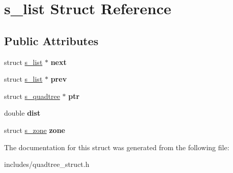 \hypertarget{structs__list}{}\section{s\+\_\+list Struct Reference}
\label{structs__list}
\subsection*{Public Attributes}
\begin{DoxyCompactItemize}
\item 
\mbox{\label{structs__list_a4586dc4198372dd0c0621981ef05d196}} 
struct \hyperlink{structs__list}{s\+\_\+list} $\ast$ {\bfseries next}
\item 
\mbox{\label{structs__list_a9ec83e01842e383a0416d298e6b9adaa}} 
struct \hyperlink{structs__list}{s\+\_\+list} $\ast$ {\bfseries prev}
\item 
\mbox{\label{structs__list_a9458c77da48d2fb998281f756889b1e4}} 
struct \hyperlink{structs__quadtree}{s\+\_\+quadtree} $\ast$ {\bfseries ptr}
\item 
\mbox{\label{structs__list_ad0979f8a3b0d9cee0150c710065e586d}} 
double {\bfseries dist}
\item 
\mbox{\label{structs__list_a88b71deb4dad0d5e1adeeb39175a26fe}} 
struct \hyperlink{structs__zone}{s\+\_\+zone} {\bfseries zone}
\end{DoxyCompactItemize}


The documentation for this struct was generated from the following file\+:\begin{DoxyCompactItemize}
\item 
includes/quadtree\+\_\+struct.\+h\end{DoxyCompactItemize}
